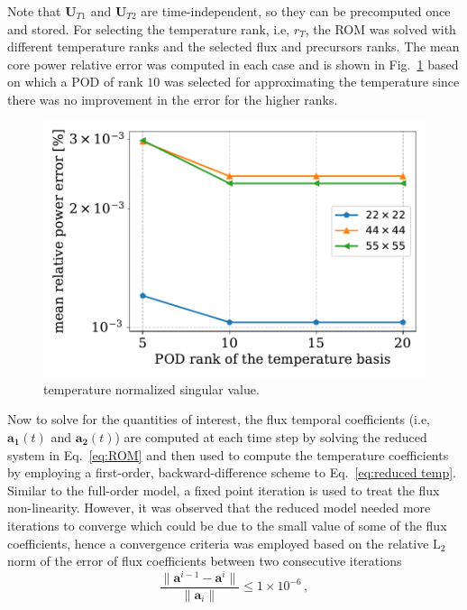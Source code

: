 \documentclass[]{interact}
\theoremstyle{plain}%
\theoremstyle{definition}
\theoremstyle{remark}
\begin{document}
Note that $\mathbf{U}_{T1}$ and $\mathbf{U}_{T2}$ are time-independent, so they can be precomputed once and stored.
For selecting the temperature rank, i.e, $r_T$, the ROM was solved with different temperature ranks and the selected flux and precursors ranks.
The mean core power relative error was computed in each case and is shown in Fig.~\ref{fig:temperature rank} based on which a POD of rank $10$ was selected for approximating the temperature since there was no improvement in the error for the higher ranks.

\begin{figure}[H]
	\centering
	\includegraphics[width=1.0\linewidth]{../figures/temperature_rank_convergence.pdf}
	\caption{temperature normalized singular value.}
	\label{fig:temperature rank}
\end{figure}

Now to solve for the quantities of interest, the flux temporal coefficients (i.e, $\mathbf{a_1}(t)$ and $\mathbf{a_2}(t)$) are computed at each time step by solving the reduced system in Eq.~\ref{eq:ROM} and then used to compute the temperature coefficients by employing a first-order, backward-difference scheme to Eq.~\ref{eq:reduced temp}.
Similar to the full-order model, a fixed point iteration is used to treat the flux non-linearity.
However, it was observed that the reduced model needed more iterations to converge which could be due to the small value of some of the flux coefficients, hence a convergence criteria was employed based on the relative $\text{L}_2$ norm of the error of flux coefficients between two consecutive iterations 
\begin{equation}
	\frac{\|\mathbf{a}^{i-1} - \mathbf{a}^{i}\|}{\|\mathbf{a}_i \|} \le 1\times 10^{-6}  \, , 
\end{equation}
\end{document}
